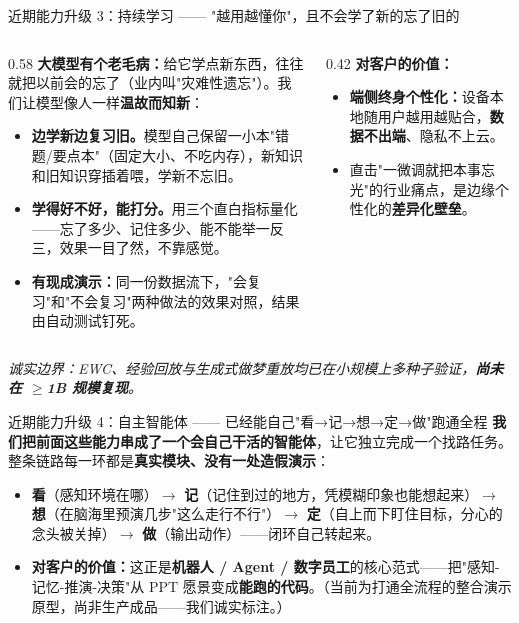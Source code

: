 ﻿\documentclass[aspectratio=169, 10pt]{beamer}
\begin{document}
\begin{frame}{近期能力升级 3：持续学习 —— "越用越懂你"，且不会学了新的忘了旧的}
\small
\begin{columns}
\begin{column}{0.58\textwidth}
\textbf{大模型有个老毛病：}给它学点新东西，往往就把以前会的忘了（业内叫"灾难性遗忘"）。我们让模型像人一样\textbf{温故而知新}：
\begin{itemize}\itemsep=0.3em
    \item \textbf{边学新边复习旧。}模型自己保留一小本"错题/要点本"（固定大小、不吃内存），新知识和旧知识穿插着喂，学新不忘旧。
    \item \textbf{学得好不好，能打分。}用三个直白指标量化——忘了多少、记住多少、能不能举一反三，效果一目了然，不靠感觉。
    \item \textbf{有现成演示：}同一份数据流下，"会复习"和"不会复习"两种做法的效果对照，结果由自动测试钉死。
\end{itemize}
\end{column}
\begin{column}{0.42\textwidth}
\textbf{对客户的价值：}
\begin{itemize}\itemsep=0.3em
    \item \textbf{端侧终身个性化：}设备本地随用户越用越贴合，\textbf{数据不出端}、隐私不上云。
    \item 直击"一微调就把本事忘光"的行业痛点，是边缘个性化的\textbf{差异化壁垒}。
\end{itemize}
\end{column}
\end{columns}
\vspace{0.3em}
{\footnotesize\itshape 诚实边界：EWC、经验回放与生成式做梦重放均已在小规模上多种子验证，\textbf{尚未在 $\geq$1B 规模复现}。}
\end{frame}

\begin{frame}{近期能力升级 4：自主智能体 —— 已经能自己"看→记→想→定→做"跑通全程}
\small
\textbf{我们把前面这些能力串成了一个会自己干活的智能体}，让它独立完成一个找路任务。整条链路每一环都是\textbf{真实模块、没有一处造假演示}：
\begin{itemize}\itemsep=0.4em
    \item \textbf{看}（感知环境在哪）$\rightarrow$ \textbf{记}（记住到过的地方，凭模糊印象也能想起来）$\rightarrow$ \textbf{想}（在脑海里预演几步"这么走行不行"）$\rightarrow$ \textbf{定}（自上而下盯住目标，分心的念头被关掉）$\rightarrow$ \textbf{做}（输出动作）——闭环自己转起来。
    \item \textbf{对客户的价值：}这正是\textbf{机器人 / Agent / 数字员工}的核心范式——把"感知-记忆-推演-决策"从 PPT 愿景变成\textbf{能跑的代码}。（当前为打通全流程的整合演示原型，尚非生产成品——我们诚实标注。）
\end{itemize}
\end{frame}
\end{document}
